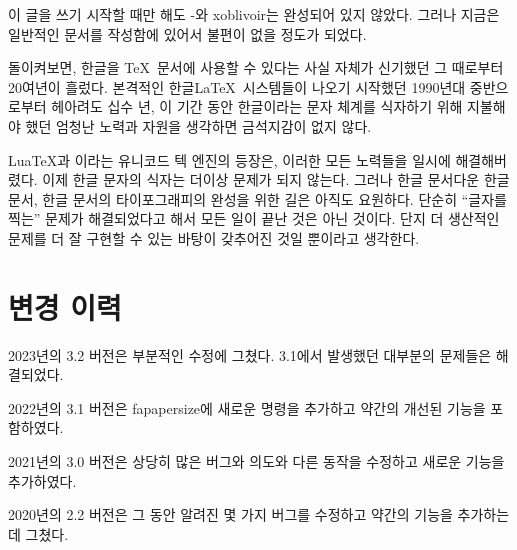 \documentclass[
	12pt,
	a4paper,
	kosection,
	footnote,
	nobookmarks,
	microtype,
	figtabcapt,
]{oblivoir}
\newcommand\xobclass{x\-ob\-liv\-oir\oblivoirallowbreak}
\def\xetexko{\XeTeX-\ko}
\begin{document}
이 글을 쓰기 시작할 때만 해도 \xetexko{}와 \xobclass{}는
완성되어 있지 않았다. 그러나 지금은 일반적인 문서를 작성함에 있어서
불편이 없을 정도가 되었다.

\bigskip

돌이켜보면, 한글을 \TeX\ 문서에 사용할 수 있다는 사실 자체가
신기했던 그 때로부터 20여년이 흘렀다. 본격적인 한글\LaTeX\ 시스템들이
나오기 시작했던 1990년대 중반으로부터 헤아려도 십수 년,
이 기간 동안 한글이라는 문자 체계를 식자하기 위해 지불해야 했던
엄청난 노력과 자원을 생각하면 금석지감이 없지 않다.

Lua\TeX 과 \XeTeX 이라는 유니코드 텍 엔진의 등장은, 이러한 모든
노력들을 일시에 해결해버렸다. 이제 한글 문자의 식자는 더이상
문제가 되지 않는다.
그러나 한글 문서다운 한글 문서, 한글 문서의 타이포그래피의 완성을
위한 길은 아직도 요원하다. 단순히 “글자를 찍는” 문제가 해결되었다고
해서 모든 일이 끝난 것은 아닌 것이다. 단지 더 생산적인 문제를
더 잘 구현할 수 있는 바탕이 갖추어진 것일 뿐이라고 생각한다.


\section{변경 이력}

\noindent
2023년의 3.2 버전은 부분적인 수정에 그쳤다. 3.1에서 발생했던 대부분의
문제들은 해결되었다.

\noindent
2022년의 3.1 버전은 fapapersize에 새로운 명령을 추가하고 약간의
개선된 기능을 포함하였다. 

\noindent
2021년의 3.0 버전은 상당히 많은 버그와 의도와 다른 동작을 수정하고 새로운 
기능을 추가하였다.

\noindent
2020년의 2.2 버전은 그 동안 알려진 몇 가지 버그를 수정하고 약간의 기능을
추가하는 데 그쳤다.




\end{document}

